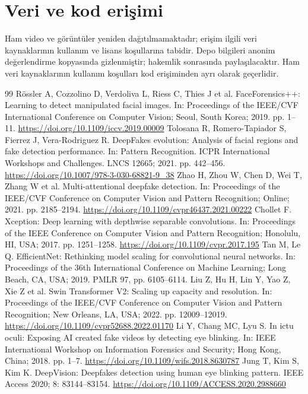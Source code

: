 \documentclass[a4paper]{elektr}
\begin{document}
\section*{Veri ve kod erişimi}
Ham video ve görüntüler yeniden dağıtılmamaktadır; erişim ilgili veri kaynaklarının kullanım ve lisans koşullarına tabidir. Depo bilgileri anonim değerlendirme kopyasında gizlenmiştir; hakemlik sonrasında paylaşılacaktır. Ham veri kaynaklarının kullanım koşulları kod erişiminden ayrı olarak geçerlidir.
\FloatBarrier
\begin{thebibliography}{99}
 Rössler A, Cozzolino D, Verdoliva L, Riess C, Thies J et al. FaceForensics++: Learning to detect manipulated facial images. In: Proceedings of the IEEE/CVF International Conference on Computer Vision; Seoul, South Korea; 2019. pp. 1--11. \url{https://doi.org/10.1109/iccv.2019.00009}
 Tolosana R, Romero-Tapiador S, Fierrez J, Vera-Rodriguez R. DeepFakes evolution: Analysis of facial regions and fake detection performance. In: Pattern Recognition. ICPR International Workshops and Challenges. LNCS 12665; 2021. pp. 442--456. \url{https://doi.org/10.1007/978-3-030-68821-9_38}
 Zhao H, Zhou W, Chen D, Wei T, Zhang W et al. Multi-attentional deepfake detection. In: Proceedings of the IEEE/CVF Conference on Computer Vision and Pattern Recognition; Online; 2021. pp. 2185--2194. \url{https://doi.org/10.1109/cvpr46437.2021.00222}
 Chollet F. Xception: Deep learning with depthwise separable convolutions. In: Proceedings of the IEEE Conference on Computer Vision and Pattern Recognition; Honolulu, HI, USA; 2017. pp. 1251--1258. \url{https://doi.org/10.1109/cvpr.2017.195}
 Tan M, Le Q. EfficientNet: Rethinking model scaling for convolutional neural networks. In: Proceedings of the 36th International Conference on Machine Learning; Long Beach, CA, USA; 2019. PMLR 97, pp. 6105--6114.
 Liu Z, Hu H, Lin Y, Yao Z, Xie Z et al. Swin Transformer V2: Scaling up capacity and resolution. In: Proceedings of the IEEE/CVF Conference on Computer Vision and Pattern Recognition; New Orleans, LA, USA; 2022. pp. 12009--12019. \url{https://doi.org/10.1109/cvpr52688.2022.01170}
 Li Y, Chang MC, Lyu S. In ictu oculi: Exposing AI created fake videos by detecting eye blinking. In: IEEE International Workshop on Information Forensics and Security; Hong Kong, China; 2018. pp. 1--7. \url{https://doi.org/10.1109/wifs.2018.8630787}
 Jung T, Kim S, Kim K. DeepVision: Deepfakes detection using human eye blinking pattern. IEEE Access 2020; 8: 83144--83154. \url{https://doi.org/10.1109/ACCESS.2020.2988660}

\end{thebibliography}
\end{document}
